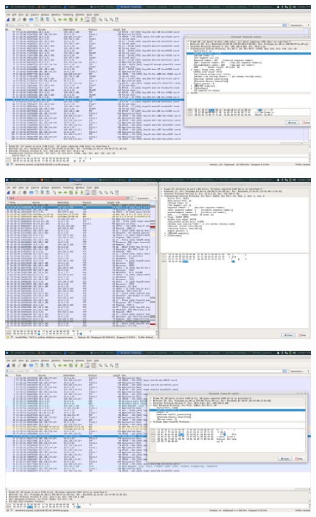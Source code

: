 \documentclass[a4paper]{article}
\begin{document}
\begin{center}
	\includegraphics[scale=0.23]{images/telnet}
\end{center}

\begin{center}
	\includegraphics[scale=0.23]{images/FTP}
\end{center}

\begin{center}
	\includegraphics[scale=0.23]{images/tftp}
\end{center}
\end{document}
